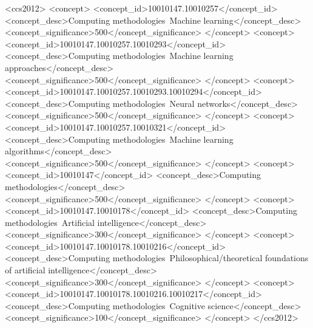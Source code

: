\documentclass[sigconf]{acmart}
\begin{document}
\begin{CCSXML}
<ccs2012>
<concept>
<concept_id>10010147.10010257</concept_id>
<concept_desc>Computing methodologies~Machine learning</concept_desc>
<concept_significance>500</concept_significance>
</concept>
<concept>
<concept_id>10010147.10010257.10010293</concept_id>
<concept_desc>Computing methodologies~Machine learning approaches</concept_desc>
<concept_significance>500</concept_significance>
</concept>
<concept>
<concept_id>10010147.10010257.10010293.10010294</concept_id>
<concept_desc>Computing methodologies~Neural networks</concept_desc>
<concept_significance>500</concept_significance>
</concept>
<concept>
<concept_id>10010147.10010257.10010321</concept_id>
<concept_desc>Computing methodologies~Machine learning algorithms</concept_desc>
<concept_significance>500</concept_significance>
</concept>
<concept>
<concept_id>10010147</concept_id>
<concept_desc>Computing methodologies</concept_desc>
<concept_significance>500</concept_significance>
</concept>
<concept>
<concept_id>10010147.10010178</concept_id>
<concept_desc>Computing methodologies~Artificial intelligence</concept_desc>
<concept_significance>300</concept_significance>
</concept>
<concept>
<concept_id>10010147.10010178.10010216</concept_id>
<concept_desc>Computing methodologies~Philosophical/theoretical foundations of artificial intelligence</concept_desc>
<concept_significance>300</concept_significance>
</concept>
<concept>
<concept_id>10010147.10010178.10010216.10010217</concept_id>
<concept_desc>Computing methodologies~Cognitive science</concept_desc>
<concept_significance>100</concept_significance>
</concept>
</ccs2012>
\end{CCSXML}




\end{document}
